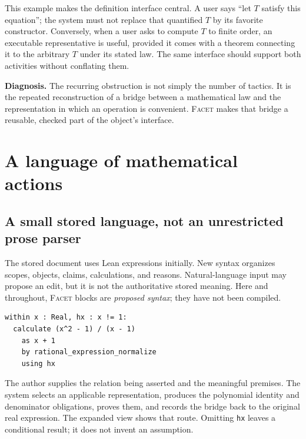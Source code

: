 \documentclass[11pt,letterpaper]{article}
\newcommand{\code}[1]{\nolinkurl{#1}}
\newcommand{\Facet}{\textsc{Facet}}
\numberwithin{equation}{section}
\begin{document}
This example makes the definition interface central. A user says ``let $T$ satisfy
this equation''; the system must not replace that quantified $T$ by its favorite
constructor. Conversely, when a user asks to compute $T$ to finite order, an
executable representative is useful, provided it comes with a theorem connecting
it to the arbitrary $T$ under its stated law. The same interface should support
both activities without conflating them.

\begin{claimbox}
\textbf{Diagnosis.} The recurring obstruction is not simply the number of tactics.
It is the repeated reconstruction of a bridge between a mathematical law and the
representation in which an operation is convenient. \Facet{} makes that bridge
a reusable, checked part of the object's interface.
\end{claimbox}

\section{A language of mathematical actions}\label{sec:surface}
\subsection{A small stored language, not an unrestricted prose parser}
The stored document uses Lean expressions initially. New syntax organizes scopes,
objects, claims, calculations, and reasons. Natural-language input may propose an
edit, but it is not the authoritative stored meaning. Here and throughout,
\Facet{} blocks are \emph{proposed syntax}; they have not been compiled.

\par\noindent\begin{minipage}{\linewidth}
\begin{lstlisting}
within x : Real, hx : x != 1:
  calculate (x^2 - 1) / (x - 1)
    as x + 1
    by rational_expression_normalize
    using hx
\end{lstlisting}
\end{minipage}\par


The author supplies the relation being asserted and the meaningful premises.
The system selects an applicable representation, produces the polynomial
identity and denominator obligations, proves them, and records the bridge back
to the original real expression. The expanded view shows that route. Omitting
\code{hx} leaves a conditional result; it does not invent an assumption.
\end{document}
